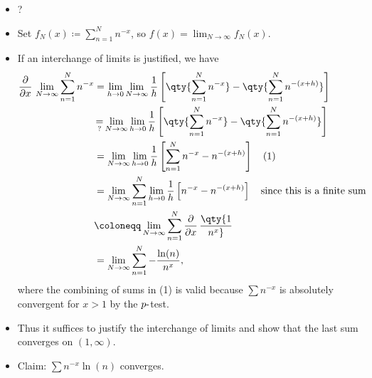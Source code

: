 \begin{solution}

\envlist

\begin{concept}

\envlist

\begin{itemize}
\tightlist
\item
  ?
\end{itemize}

\end{concept}

\begin{itemize}
\item
  Set \(f_N(x) \coloneqq\sum_{n=1}^N n^{-x}\), so
  \(f(x) = \lim_{N\to\infty} f_N(x)\).
\item
  If an interchange of limits is justified, we have
  \begin{align*}  
  {\frac{\partial }{\partial x}\,} \lim_{N\to\infty} \sum_{n=1}^N n^{-x}
  &= \lim_{h\to 0} \lim_{N\to\infty} {1\over h} \left[ \qty{\sum_{n=1}^N n^{-x}} - \qty{\sum_{n=1}^N n^{-(x+h)} }\right] \\
  &\mathop{\mathrm{=}}_{?} \lim_{N\to\infty} \lim_{h\to 0} {1\over h} \left[ \qty{\sum_{n=1}^N n^{-x}} - \qty{\sum_{n=1}^N n^{-(x+h)} }\right] \\
  &= \lim_{N\to\infty} \lim_{h\to 0} {1\over h} \left[ {\sum_{n=1}^N n^{-x}} - {n^{-(x+h)} }\right] \quad\text{(1)} \\
  &= \lim_{N\to\infty} \sum_{n=1}^N \lim_{h\to 0} {1\over h} \left[ n^{-x} - n^{-(x+h)} \right] \quad\text{since this is a finite sum} \\
  &\coloneqq\lim_{N\to\infty} \sum_{n=1}^N {\frac{\partial }{\partial x}\,}\qty{1 \over n^x} \\ 
  &= \lim_{N\to\infty} \sum_{n=1}^N -{\ln(n) \over n^x}
  ,\end{align*}
  where the combining of sums in (1) is valid because \(\sum n^{-x}\) is
  absolutely convergent for \(x>1\) by the \(p{\hbox{-}}\)test.
\item
  Thus it suffices to justify the interchange of limits and show that
  the last sum converges on \((1, \infty)\).
\item
  Claim: \(\sum n^{-x}\ln(n)\) converges.


\end{itemize}
\end{solution}
